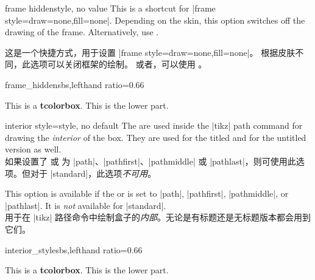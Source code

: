 \begin{docTcbKey}{frame hidden}{}{style, no value}
This is a shortcut for |frame style={draw=none,fill=none}|.
Depending on the skin, this option switches off the drawing of the
frame.
Alternatively, use .

这是一个快捷方式，用于设置 |frame style={draw=none,fill=none}|。 根据皮肤不同，此选项可以关闭框架的绘制。 或者，可以使用 。
\begin{exdispExample*}{frame_hidden}{sbs,lefthand ratio=0.66}

\begin{tcolorbox}[enhanced,title=My title,
frame hidden]
This is a \textbf{tcolorbox}.
\tcblower
This is the lower part.
\end{tcolorbox}
\end{exdispExample*}
\end{docTcbKey}


\begin{docTcbKey}{interior style}{=}{style, no default}
The  are used inside the |tikz| path command
for drawing the \emph{interior} of the box. They are used for the titled
and for the untitled version as well.\\
如果设置了  或  为 |path|、|pathfirst|、|pathmiddle| 或 |pathlast|，则可使用此选项。但对于 |standard|，此选项\emph{不可用}。

This option is available if the 
or  is set to
|path|, |pathfirst|, |pathmiddle|, or |pathlast|.
It is \emph{not} available for |standard|.\\
 用于在 |tikz| 路径命令中绘制盒子的\emph{内部}。无论是有标题还是无标题版本都会用到它们。
\begin{exdispExample*}{interior_style}{sbs,lefthand ratio=0.66}

\begin{tcolorbox}[enhanced,title=My title,
interior style={left color=red!20!white,
                right color=yellow!50!white}]
This is a \textbf{tcolorbox}.
\tcblower
This is the lower part.
\end{tcolorbox}
\end{exdispExample*}
\end{docTcbKey}

